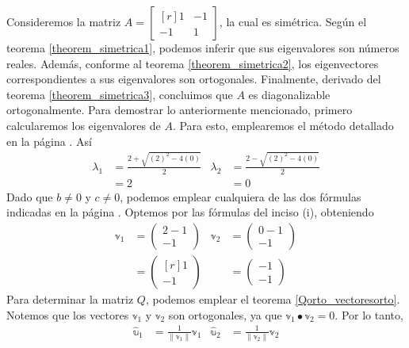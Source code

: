\begin{example}
    Consideremos la matriz $A = \begin{bmatrix*}[r]
        1 & -1 \\
        -1 & 1
    \end{bmatrix*}$, la cual es simétrica. Según el teorema \ref{theorem_simetrica1}, podemos inferir que sus eigenvalores son números reales. Además, conforme al teorema \ref{theorem_simetrica2}, los eigenvectores correspondientes a sus eigenvalores son ortogonales. Finalmente, derivado del teorema \ref{theorem_simetrica3}, concluimos que $A$ es diagonalizable ortogonalmente. Para demostrar lo anteriormente mencionado, primero calcularemos los eigenvalores de $A$. Para esto, emplearemos el método detallado en la página \pageref{metodo_eigen_2x2}. Así
    \begin{align*}
        \lambda_1 & = \frac{2 + \sqrt{(2)^2 - 4(0)}}{2} & \lambda_2 & = \frac{2 - \sqrt{(2)^2 - 4(0)}}{2} \\
        & = 2 & & = 0
    \end{align*}
    Dado que $b \neq 0$ y $c \neq 0$, podemos emplear cualquiera de las dos fórmulas indicadas en la página \pageref{metodo_eigen_2x2}. Optemos por las fórmulas del inciso (i), obteniendo
    \begin{align*}
        \mathbb{v}_1 & = \begin{pmatrix} 2 - 1 \\ - 1 \end{pmatrix} & \mathbb{v}_2 & = \begin{pmatrix} 0 - 1 \\ - 1 \end{pmatrix} \\
        & = \begin{pmatrix*}[r] 1 \\ -1 \end{pmatrix*} & & = \begin{pmatrix} -1 \\ -1 \end{pmatrix}
    \end{align*}\newpage\noindent
    Para determinar la matriz $Q$, podemos emplear el teorema \ref{Qorto_vectoresorto}. Notemos que los vectores $\mathbb{v}_1$ y $\mathbb{v}_2$ son ortogonales, ya que $\mathbb{v}_1 \bullet \mathbb{v}_2 = 0$. Por lo tanto,
    \begin{align*}
        \hat{\mathbb{u}}_1 & = \frac{1}{\| \mathbb{v}_1 \|} \mathbb{v}_1 & \hat{\mathbb{u}}_2 & = \frac{1}{\| \mathbb{v}_2 \|} \mathbb{v}_2 \\

\end{align*}
\end{example}
